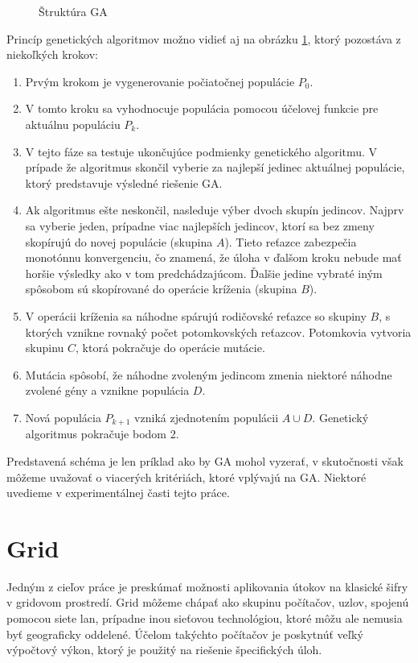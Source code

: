 \begin{figure}[!h]
  \centering
  
  \caption{Štruktúra GA}
  \label{img:ga}
\end{figure}


Princíp genetických algoritmov možno vidieť aj na obrázku \ref{img:ga}, ktorý pozostáva z niekoľkých krokov:
\begin{enumerate}
\item
  Prvým krokom je vygenerovanie počiatočnej populácie $ P_0 $.
\item
  V tomto kroku sa vyhodnocuje populácia pomocou účelovej funkcie pre aktuálnu populáciu $ P_k $.
\item
  V tejto fáze sa testuje ukončujúce podmienky genetického algoritmu.
  V prípade že algoritmus skončil vyberie za najlepší jedinec aktuálnej populácie, ktorý predstavuje výsledné riešenie GA.
\item
  Ak algoritmus ešte neskončil, nasleduje výber dvoch skupín jedincov. Najprv sa vyberie jeden, prípadne viac najlepších jedincov, ktorí sa bez zmeny skopírujú
  do novej populácie (skupina $ A $). Tieto reťazce zabezpečia monotónnu konvergenciu, čo znamená, že úloha v ďalšom kroku nebude mať horšie výsledky ako v tom predchádzajúcom.
  Ďalšie jedine vybraté iným spôsobom sú skopírované do operácie kríženia (skupina $ B $).
\item
  V operácii kríženia sa náhodne spárujú rodičovské reťazce so skupiny $ B $, s ktorých vznikne rovnaký počet potomkovských reťazcov.
  Potomkovia vytvoria skupinu $ C $, ktorá pokračuje do operácie mutácie. 
\item
  Mutácia spôsobí, že náhodne zvoleným jedincom zmenia niektoré náhodne zvolené gény a vznikne populácia $ D $.
\item
  Nová populácia $ P_{k+1} $ vzniká zjednotením populácii $ A \cup D $. Genetický algoritmus pokračuje bodom 2.
\end{enumerate}
Predstavená schéma je len príklad ako by GA mohol vyzerať, v skutočnosti však môžeme uvažovať o viacerých kritériách, ktoré vplývajú na GA.
Niektoré uvedieme v experimentálnej časti tejto práce.

\section{Grid}
Jedným z cieľov práce je preskúmať možnosti aplikovania útokov na klasické šifry v gridovom prostredí.
Grid môžeme chápať ako skupinu počítačov, uzlov, spojenú pomocou siete \acrfull{lan}, prípadne inou sieťovou technológiou,
ktoré môžu ale nemusia byť geograficky oddelené.
Účelom takýchto počítačov je poskytnúť veľký výpočtový výkon, ktorý je použitý na riešenie špecifických úloh.

